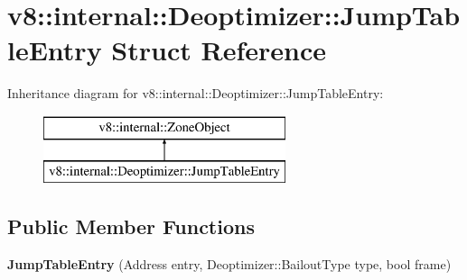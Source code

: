 \hypertarget{structv8_1_1internal_1_1_deoptimizer_1_1_jump_table_entry}{}\section{v8\+:\+:internal\+:\+:Deoptimizer\+:\+:Jump\+Table\+Entry Struct Reference}
\label{structv8_1_1internal_1_1_deoptimizer_1_1_jump_table_entry}
Inheritance diagram for v8\+:\+:internal\+:\+:Deoptimizer\+:\+:Jump\+Table\+Entry\+:\begin{figure}[H]
\begin{center}
\leavevmode
\includegraphics[height=2.000000cm]{structv8_1_1internal_1_1_deoptimizer_1_1_jump_table_entry}
\end{center}
\end{figure}
\subsection*{Public Member Functions}
\begin{DoxyCompactItemize}
\item 
\hypertarget{structv8_1_1internal_1_1_deoptimizer_1_1_jump_table_entry_a7bce0437f9ebbb28c8a03d6cf2935ed2}{}{\bfseries Jump\+Table\+Entry} (Address entry, Deoptimizer\+::\+Bailout\+Type type, bool frame)\label{structv8_1_1internal_1_1_deoptimizer_1_1_jump_table_entry_a7bce0437f9ebbb28c8a03d6cf2935ed2}

\end{DoxyCompactItemize}
